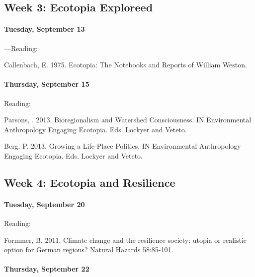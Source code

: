 \subsection{\textbf{Week 3}: Ecotopia Exploreed}
      
\medskip\noindent\paragraph{Tuesday, September 13}---Reading:

      \begin{itemize*}
      \item Callenbach, E. 1975. Ecotopia: The Notebooks and Reports of William Weston.
      \end{itemize*}
      
\medskip\noindent\paragraph{Thursday, September 15}

\noindent Reading:
      \begin{itemize*}
      \item Parsons, . 2013. Bioregionalism and Watershed Consciousness. IN Environmental Anthropology Engaging Ecotopia. Eds. Lockyer and Veteto.
      \item Berg. P. 2013. Growing a Life-Place Politics. IN Environmental Anthropology Engaging Ecotopia. Eds. Lockyer and Veteto.
    \end{itemize*}
      

\subsection{\textbf{Week 4}: Ecotopia and Resilience}
    
\paragraph{Tuesday, September 20}

\noindent Reading:
    \begin{itemize*}
    \item Formmer, B. 2011. Climate change and the resilience society: utopia or realistic option for German regions? Natural Hazards 58:85-101.
    \end{itemize*}
    
\paragraph{Thursday, September 22}		
    
